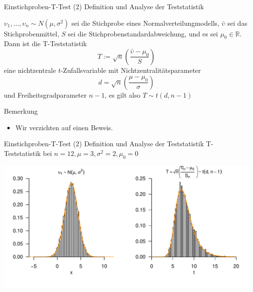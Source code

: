 \documentclass[
  8pt,
  ignorenonframetext,
]{beamer}
\providecommand{\tightlist}{%
  \setlength{\itemsep}{0pt}\setlength{\parskip}{0pt}}
\newcommand{\ups} {\upsilon}
\begin{document}
\begin{frame}{Einstichproben-T-Test \textbar{} (2) Definition und
Analyse der Teststatistik}
\protect\hypertarget{einstichproben-t-test-2-definition-und-analyse-der-teststatistik-4}{}
\footnotesize
\begin{theorem}
\justifying
\normalfont
$\ups_1,...,\ups_n \sim N(\mu,\sigma^2)$ sei die Stichprobe eines Normalverteilungmodells,
$\bar{\ups}$ sei das Stichprobenmittel, $S$ sei die Stichprobenstandardabweichung,
und es sei $\mu_0 \in \mathbb{R}$. Dann ist die  T-Teststatistik
\begin{equation}
T := \sqrt{n}\left(\frac{\bar{\ups} - \mu_0}{S} \right)
\end{equation}
eine nichtzentrale $t$-Zufallsvariable mit Nichtzentralitätsparameter
\begin{equation}
d = \sqrt{n}\left(\frac{\mu - \mu_0}{\sigma} \right)
\end{equation}
und Freiheitsgradparameter $n-1$, es gilt also $T \sim t(d,n-1)$
\end{theorem}

Bemerkung

\begin{itemize}
\tightlist
\item
  Wir verzichten auf einen Beweis.
\end{itemize}
\end{frame}

\begin{frame}{Einstichproben-T-Test \textbar{} (2) Definition und
Analyse der Teststatistik}
\protect\hypertarget{einstichproben-t-test-2-definition-und-analyse-der-teststatistik-5}{}
T-Teststatistik bei \(n = 12, \mu = 3, \sigma^2 = 2, \mu_0 = 0\)
\vspace{8mm}

\begin{center}\includegraphics[width=1\linewidth]{12_Abbildungen/wtfi_12_t_teststatistik} \end{center}
\end{frame}
\end{document}
